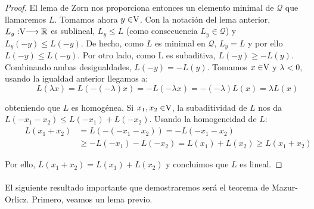 \begin{proof}
		El lema de Zorn nos proporciona entonces un elemento minimal de $ \mathcal{Q} $ que llamaremos $ L $. Tomamos ahora $ y \in \vecSpace $. Con la notación del lema anterior, $ L_y : \vecSpace \longrightarrow \RR $ es sublineal, $ L_y \leq L $ (como consecuencia $ L_y \in \mathcal{Q} $) y $ L_y (-y) \leq L(-y) $. De hecho, como $ L $ es minimal en $ \mathcal{Q} $, $ L_y = L $ y por ello $ L (-y) \leq L(-y) $. Por otro lado, como L es subaditiva, $ L(-y) \geq -L(y) $. Combinando ambas desigualdades, $ L(-y) = -L(y) $. Tomamos $ x \in \vecSpace $ y $ \lambda < 0 $, usando la igualdad anterior llegamos a:
		\[ \qquad \quad
		L(\lambda x) = L (-(-\lambda)x) = -L(-\lambda x) = -(-\lambda)L(x) = \lambda L(x) \label{1}
		\] 
		
		obteniendo que $ L $ es homogénea. Si $ x_1, x_2 \in \vecSpace $, la subaditividad de $ L $ nos da $ L(-x_1-x_2) \leq L(-x_1) + L(-x_2) $. Usando la homogeneidad de $ L $:
		\begin{equation*}
		\begin{split} \qquad
		L(x_1+x_2) &= L(-(-x_1-x_2)) = -L(-x_1-x_2) \\ 
		& \geq -L(-x_1)-L(-x_2) = L(x_1) + L (x_2) \geq L(x_1+x_2) 
		\end{split}
		\end{equation*}
		
		Por ello, $	L(x_1+x_2) = L(x_1) + L (x_2) $ y concluimos que $ L $ es lineal.
		
	\end{proof}

	\paragraph{} El siguiente resultado importante que demostraremos será el teorema de Mazur-Orlicz. Primero, veamos un lema previo.
	
